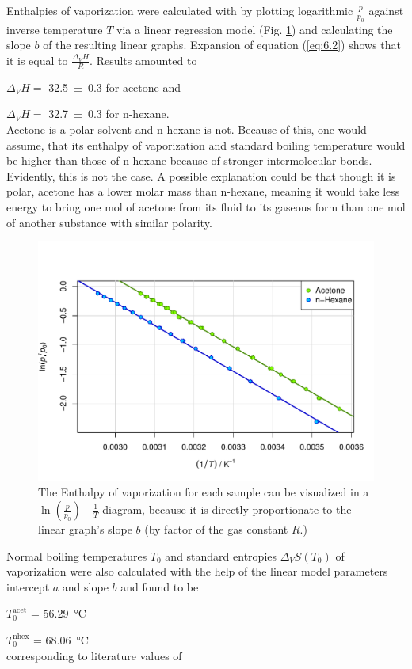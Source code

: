 Enthalpies of vaporization were calculated with by plotting logarithmic $\frac{p}{p_0}$ against inverse temperature $T$ via a linear regression model (Fig. \ref{fig:ddr1_inv_ln}) and calculating the slope $b$ of the resulting linear graphs. Expansion of equation (\ref{eq:6.2}) shows that it is equal to $\frac{\Delta_VH}{R}$. Results amounted to 

$\Delta_VH=$ \qty{32.5 \pm 0.3}{\kJpmole} for acetone and 

$\Delta_VH=$ \qty{32.7 \pm 0.3}{\kJpmole} for n-hexane. 
\\Acetone is a polar solvent and n-hexane is not. Because of this, one would assume, that its enthalpy of vaporization and standard boiling temperature would be higher than those of n-hexane because of stronger intermolecular bonds. Evidently, this is not the case. A possible explanation could be that though it is polar, acetone has a lower molar mass than n-hexane, meaning it would take less  energy to bring one mol of acetone from its fluid to its gaseous form than one mol of another substance with similar polarity.

 
\begin{figure}[H]
    \centering
    \includegraphics[width=.5\textwidth]{figures/DDR1_inv_ln.pdf}
    \caption{The Enthalpy of vaporization for each sample can be visualized in a $\ln\left(\frac{p}{p_0}\right)$ - $\frac{1}{T}$ diagram, because it is directly proportionate to the linear graph's slope $b$ (by factor of the gas constant $R$.)}
    \label{fig:ddr1_inv_ln}
\end{figure}


Normal boiling temperatures $T_0$ and standard entropies $\Delta_VS(T_0)$ of vaporization were also calculated with the help of the linear model parameters intercept $a$ and slope $b$ and found to be 

$T_0^{\text{acet}}$ = \qty{56.29}{\celsius}  

$T_0^{\text{nhex}}$ = \qty{68.06}{\celsius}
\\corresponding to literature values of 

